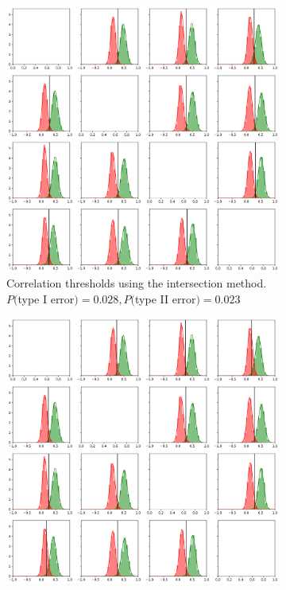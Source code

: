\begin{figure}[ht]
    \captionsetup{width=.9\linewidth}
    \begin{subfigure}{.5\textwidth}
      \centering\captionsetup{width=.8\linewidth}
      \includegraphics[width=.9\linewidth]{images/threshold_dist_clean.png}  
      \caption{Correlation thresholds using the intersection method. $P($type I error$)=0.028, P($type II error$)=0.023$}
      \label{fig:threshold_dist}
    \end{subfigure}
    \begin{subfigure}{.5\textwidth}
      \centering\captionsetup{width=.8\linewidth}
      \includegraphics[width=.9\linewidth]{images/ppf_dist_clean.png}  

\end{subfigure}
\end{figure}
